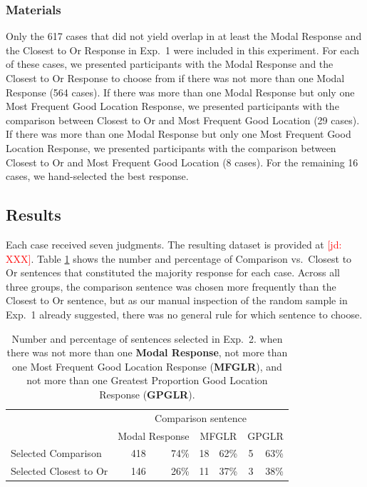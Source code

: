 \documentclass[11pt,letterpaper]{article}
\newcommand{\jd}[1]{\textcolor{Red}{[jd: #1]}}
\newcommand{\tableref}[1]{Table \ref{#1}}
\begin{document}
\subsubsection{Materials}

Only the 617 cases that did not yield overlap in at least the Modal Response and the Closest to Or Response in Exp.~1 were included in this experiment. For each of these cases, we presented participants with the Modal Response and the Closest to Or Response to choose from if there was not more than one Modal Response (564 cases). If there was more than one Modal Response but only one Most Frequent Good Location Response, we presented participants with the comparison between Closest to Or and Most Frequent Good Location (29 cases). If there was more than one Modal Response but only one Most Frequent Good Location Response, we presented participants with the comparison between Closest to Or and Most Frequent Good Location (8 cases). For the remaining 16 cases, we hand-selected the best response.

\subsection{Results}

Each case received seven judgments. The resulting dataset is provided at \jd{XXX}. \tableref{tab:exp2results} shows the number and percentage of Comparison vs.~Closest to Or sentences that constituted the majority response for each case. Across all three groups, the comparison sentence was chosen more frequently than the Closest to Or sentence, but as our manual inspection of the random sample in Exp.~1 already suggested, there was no general rule for which sentence to choose. 

\begin{table}
\centering
\caption{Number and percentage of sentences selected in Exp.~2. when there was not more than one \textbf{Modal Response}, not more than one Most Frequent Good Location Response (\textbf{MFGLR}), and not more than one Greatest Proportion Good Location Response (\textbf{GPGLR}).}
\begin{tabular}{l r r r r r r}
\toprule
& \multicolumn{6}{c}{Comparison sentence}\\
 & \multicolumn{2}{c}{Modal Response} & \multicolumn{2}{c}{MFGLR} & \multicolumn{2}{c}{GPGLR}\\
\midrule
Selected Comparison & 418 & 74\% & 18 & 62\% & 5 & 63\%\\
Selected Closest to Or & 146 & 26\% & 11 & 37\% & 3 & 38\%\\
\bottomrule
\end{tabular}
\label{tab:exp2results}
\end{table}
\end{document}
